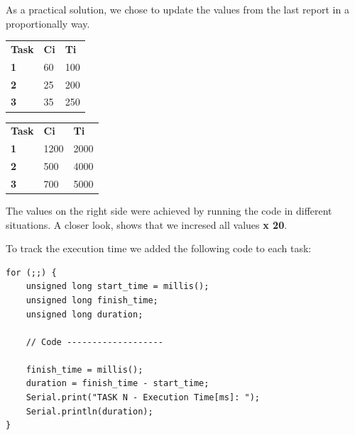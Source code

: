 \documentclass[11pt]{article}
\begin{document}
As a practical solution, we chose to update the values from the last report in a proportionally way.
 
\begin{table}[H]
    \caption{Theoretical values (left) and implemented values (right) in \textit{ms}:}
    \begin{minipage}{0.7\linewidth}
		\begin{table}[H]
		\begin{tabular}{lll}
		\textbf{Task} & \textbf{Ci} & \textbf{Ti} \\
		\textbf{1}    & 60         & 100           \\
		\textbf{2}    & 25         & 200           \\
		\textbf{3}    & 35         & 250          
		\end{tabular}
		\label{table:rt-1}
		\end{table}
    \end{minipage}%
    \begin{minipage}{.5\linewidth}
		\begin{table}[H]
		\begin{tabular}{lll}
		\textbf{Task} & \textbf{Ci} & \textbf{Ti} \\
		\textbf{1}    & 1200         & 2000           \\
		\textbf{2}    & 500         & 4000           \\
		\textbf{3}    & 700         & 5000          
		\end{tabular}
		\label{table:rt-2}
		\end{table}
    \end{minipage} 
\end{table}

The values on the right side were achieved by running the code in different situations. A closer look, shows that we incresed all values \textbf{x 20}.

To track the execution time we added the following code to each task:

\begin{verbatim}
for (;;) {
    unsigned long start_time = millis();
    unsigned long finish_time;
    unsigned long duration;

    // Code -------------------

    finish_time = millis();      
    duration = finish_time - start_time;
    Serial.print("TASK N - Execution Time[ms]: ");
    Serial.println(duration); 
}
\end{verbatim}
\end{document}

